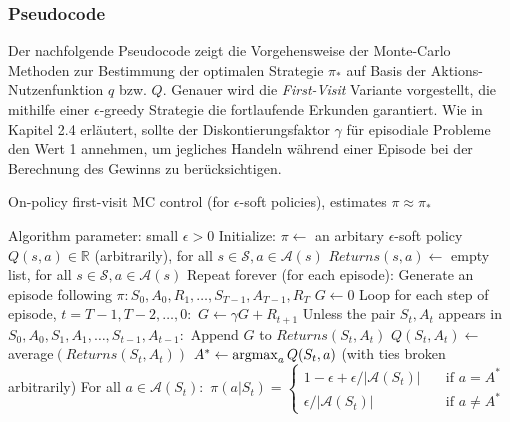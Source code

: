 \subsubsection{Pseudocode}
Der nachfolgende Pseudocode \cite[S.~101]{Sutton1998} zeigt die Vorgehensweise der Monte-Carlo Methoden zur Bestimmung der optimalen Strategie $\pi_*$ auf Basis der Aktions-Nutzenfunktion $q$ bzw. $Q$. Genauer wird die \textit{First-Visit} Variante vorgestellt, die mithilfe einer $\epsilon$-greedy Strategie die fortlaufende Erkunden garantiert. Wie in Kapitel 2.4 erläutert, sollte der Diskontierungsfaktor $\gamma$ für episodiale Probleme den Wert 1 annehmen, um jegliches Handeln während einer Episode bei der Berechnung des Gewinns zu berücksichtigen.
\par 
\begin{algorithm}
    \caption{On-policy first-visit MC control (for $\epsilon$-soft policies), estimates $\pi \approx \pi_*$}
    \begin{algorithmic}[1]
        \State Algorithm parameter: small $\epsilon > 0$
        \State Initialize:
        \Indent
           \State $\pi \gets$ an arbitary $\epsilon$-soft policy
           \State $Q(s,a) \in \mathbb{R}$ (arbitrarily), for all $s \in \mathcal{S}, a \in \mathcal{A}(s)$
           \State $Returns(s,a) \gets$ empty list, for all $s \in \mathcal{S}, a \in \mathcal{A}(s)$
        \EndIndent
        \State Repeat forever (for each episode):
        \Indent
            \State Generate an episode following $\pi: S_0, A_0, R_1, \dots, S_{T-1}, A_{T-1}, R_T$
            \State $G \gets 0$
            \State Loop for each step of episode, $t= T-1,T-2, \dots, 0:$
            \Indent
                \State $G \gets \gamma G + R_{t+1}$
                \State Unless the pair $S_t, A_t$ appears in $S_0, A_0, S_1, A_1, \dots ,S_{t-1}, A_{t-1}:$
                \Indent
                    \State Append $G$ to $Returns(S_t,A_t)$
                    \State $Q(S_t,A_t) \gets$ average$(Returns(S_t,A_t))$
                    \State $A^* \gets \operatorname*{argmax}_a Q(S_t, a)$ (with ties broken arbitrarily)
                    \State For all $a \in \mathcal{A}(S_t):$
                    \Indent
                     \State  $\pi(a|S_t) =   
                        \begin{cases}
                            1-\epsilon + \epsilon / |\mathcal{A}(S_t)|      & \quad \text{if } a = A^* \\
                            \epsilon / |\mathcal{A}(S_t)|  & \quad \text{if } a \neq A^*
                        \end{cases}$
                    \EndIndent
                \EndIndent
            \EndIndent
        \EndIndent 
    \end{algorithmic}
\end{algorithm}
